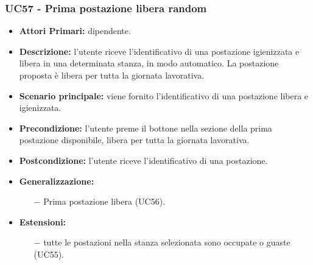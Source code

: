 \subsubsection{ UC57 - Prima postazione libera random}
\begin{itemize}
	\item\textbf{Attori Primari:} dipendente.
	\item\textbf{Descrizione:} l’utente riceve l'identificativo di una postazione igienizzata e libera in una determinata stanza, 
	in modo automatico. La postazione proposta è libera per tutta la giornata lavorativa.
	\item\textbf{Scenario principale:} viene fornito l'identificativo di una postazione libera e igienizzata.
	\item\textbf{Precondizione:} l’utente preme il bottone nella sezione della prima postazione disponibile, libera per tutta la giornata lavorativa.
	\item\textbf{Postcondizione:} l’utente riceve l'identificativo di una postazione.
	\item\textbf{Generalizzazione:}
	\begin{itemize}
		\item[$-$] Prima postazione libera (UC56).
	\end{itemize}
	\item\textbf{Estensioni:}
	\begin{itemize}
		\item[$-$] tutte le postazioni nella stanza selezionata sono occupate o guaste (UC55).
	\end{itemize}
\end{itemize}

